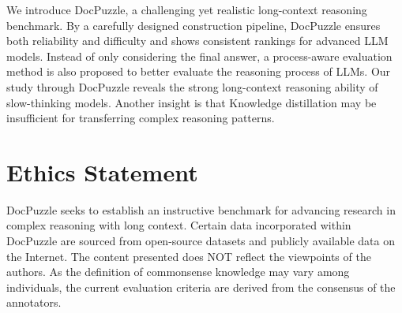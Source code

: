 We introduce DocPuzzle, a challenging yet realistic long-context reasoning benchmark. By a carefully designed construction pipeline, DocPuzzle ensures both reliability and difficulty and shows consistent rankings for advanced LLM models.
Instead of only considering the final answer, a process-aware evaluation method is also proposed to better evaluate the reasoning process of LLMs.
Our study through DocPuzzle reveals the strong long-context reasoning ability of slow-thinking models.
Another insight is that Knowledge distillation may be insufficient for transferring complex reasoning patterns.

\section*{Ethics Statement}
DocPuzzle seeks to establish an instructive benchmark for advancing research in complex reasoning with long context.
Certain data incorporated within DocPuzzle are sourced from open-source datasets and publicly available data on the Internet.
The content presented does NOT reflect the viewpoints of the authors.
As the definition of commonsense knowledge may vary among individuals, the current evaluation criteria are derived from the consensus of the annotators.




